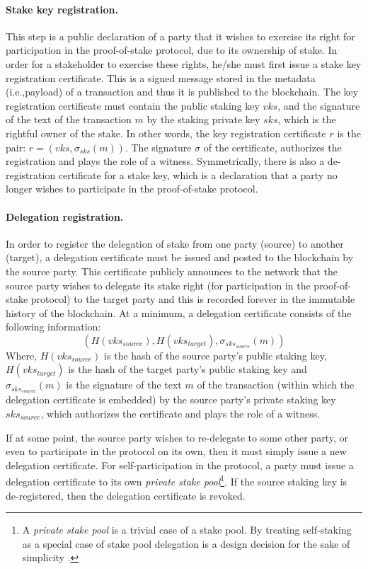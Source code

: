 \documentclass[11pt,a4paper]{article}
\begin{document}
\paragraph{Stake key registration.}
This step is a public declaration of a party that it wishes to exercise its
right for participation in the proof-of-stake protocol, due to its ownership of
stake. In order for a stakeholder to exercise these rights, he/she must first
issue a stake key registration certificate. This is a signed message stored in
the metadata (i.e.,payload) of a transaction and thus it is published to the
blockchain. The key registration certificate must contain the public staking key
$vks$, and the signature of the text of the transaction $m$ by the staking
private key $sks$, which is the rightful owner of the stake. In other words, the
key registration certificate $r$ is the pair: $r = (vks, \sigma_{sks}(m))$. The
signature $\sigma$ of the certificate, authorizes the registration and plays the
role of a witness.
%
Symmetrically, there is also a de-registration certificate for a stake key,
which is a declaration that a party no longer wishes to participate in the
proof-of-stake protocol.

\paragraph{Delegation registration.}
In order to register the delegation of stake from one party (source) to another
(target), a delegation certificate must be issued and posted to the blockchain
by the source party. This certificate publicly announces to the network that the
source party wishes to delegate its stake right (for participation in the
proof-of-stake protocol) to the target party and this is recorded forever in the
immutable history of the blockchain. At a minimum, a delegation certificate
consists of the following information:
$$
(H(vks_{source}), H(vks_{target}), \sigma_{sks_{source}}(m))
$$
Where, $H(vks_{source})$ is the hash of the source party's public staking key,
$H(vks_{target})$ is the hash of the target party's public staking key and
$\sigma_{sks_{source}}(m)$ is the signature of the text $m$ of the transaction
(within which the delegation certificate is embedded) by the source party's
private staking key $sks_{source}$, which authorizes the certificate and plays
the role of a witness.

If at some point, the source party wishes to re-delegate to some other party, or
even to participate in the protocol on its own, then it must simply issue a new
delegation certificate. For self-participation in the protocol, a party must
issue a delegation certificate to its own \emph{private stake pool}\footnote{A
  \emph{private stake pool} is a trivial case of a stake pool. By treating
  self-staking as a special case of stake pool delegation is a design decision
  for the sake of simplicity \cite{deldesign}.}. If the source staking key is
de-registered, then the delegation certificate is revoked.
\end{document}
